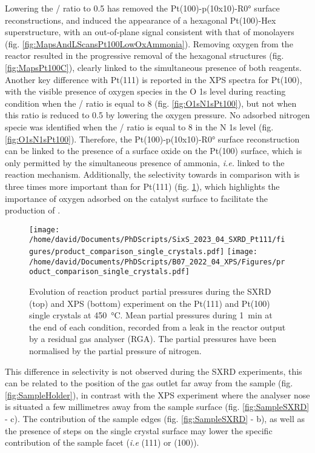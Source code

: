 Lowering the / ratio to \num{0.5} has removed the Pt(100)-p(10x10)-R\ang{0} surface reconstructions, and induced the appearance of a hexagonal Pt(100)-Hex superstructure, with an out-of-plane signal consistent with that of monolayers (fig. \ref{fig:MapsAndLScansPt100LowOxAmmonia}).
Removing oxygen from the reactor resulted in the progressive removal of the hexagonal structures (fig. \ref{fig:MapsPt100C}), clearly linked to the simultaneous presence of both reagents.
Another key difference with Pt(111) is reported in the XPS spectra for Pt(100), with the visible presence of oxygen species in the O 1s level during reacting condition when the / ratio is equal to \num{8} (fig. \ref{fig:O1sN1sPt100}), but not when this ratio is reduced to \num{0.5} by lowering the oxygen pressure.
No adsorbed nitrogen specie was identified when the / ratio is equal to \num{8} in the N 1s level  (fig. \ref{fig:O1sN1sPt100}).
Therefore, the Pt(100)-p(10x10)-R\ang{0} surface reconstruction can be linked to the presence of a surface oxide on the Pt(100) surface, which is only permitted by the simultaneous presence of ammonia, \textit{i.e.} linked to the reaction mechanism.
Additionally, the selectivity towards  in comparison with  is three times more important than for Pt(111) (fig. \ref{fig:RGA450Pt111AndPt100}), which highlights the importance of oxygen adsorbed on the catalyst surface to facilitate the production of .

\begin{figure}[!htb]
    \centering
    \texttt{[image: /home/david/Documents/PhDScripts/SixS\_2023\_04\_SXRD\_Pt111/figures/product\_comparison\_single\_crystals.pdf]}
    \texttt{[image: /home/david/Documents/PhDScripts/B07\_2022\_04\_XPS/Figures/product\_comparison\_single\_crystals.pdf]}
    \caption{
        Evolution of reaction product partial pressures during the SXRD (top) and XPS (bottom) experiment on the Pt(111) and Pt(100) single crystals at \qty{450}{\degreeCelsius}.
        Mean partial pressures during \qty{1}{\minute} at the end of each condition, recorded from a leak in the reactor output by a residual gas analyser (RGA).
        The partial pressures have been normalised by the partial pressure of nitrogen.
    }
    \label{fig:RGA450Pt111AndPt100}
\end{figure}

This difference in selectivity is not observed during the SXRD experiments, this can be related to the position of the gas outlet far away from the sample (fig. \ref{fig:SampleHolder}), in contrast with the XPS experiment where the analyser nose is situated a few millimetres away from the sample surface (fig. \ref{fig:SampleSXRD} - c).
The contribution of the sample edges (fig. \ref{fig:SampleSXRD} - b), as well as the presence of steps on the single crystal surface may lower the specific contribution of the sample facet (\textit{i.e} (111) or (100)).

